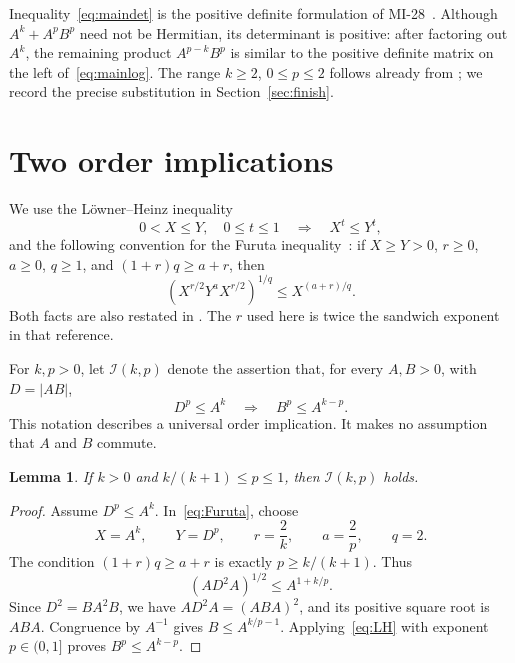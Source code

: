 \documentclass[11pt,a4paper]{article}
\newtheorem{lemma}[theorem]{Lemma}
\theoremstyle{remark}
\begin{document}
Inequality~\eqref{eq:maindet} is the positive definite formulation
of MI-28~\cite{MI28,GThesis}. Although \(A^k+A^pB^p\) need not be
Hermitian, its determinant is positive: after factoring out \(A^k\),
the remaining product \(A^{p-k}B^p\) is similar to the positive
definite matrix on the left of~\eqref{eq:mainlog}.
The range \(k\ge2\), \(0\le p\le2\) follows already from
\cite[Lemma~2.5]{GAMA20}; we record the precise substitution in
Section~\ref{sec:finish}.

\section{Two order implications}

We use the L\"owner--Heinz inequality
\begin{equation}\label{eq:LH}
 0<X\le Y,\quad 0\le t\le1
 \quad\Longrightarrow\quad X^t\le Y^t,
\end{equation}
and the following convention for the Furuta inequality~\cite{Furuta87}:
if \(X\ge Y>0\), \(r\ge0\), \(a\ge0\), \(q\ge1\), and
\((1+r)q\ge a+r\), then
\begin{equation}\label{eq:Furuta}
 (X^{r/2}Y^aX^{r/2})^{1/q}\le X^{(a+r)/q}.
\end{equation}
Both facts are also restated in
\cite[Propositions~1--2]{Tanahashi99}. The \(r\) used here is twice
the sandwich exponent in that reference.

For \(k,p>0\), let \(\mathcal I(k,p)\) denote the assertion that,
for every \(A,B>0\), with \(D=|AB|\),
\begin{equation}\label{eq:imp}
 D^p\le A^k\quad\Longrightarrow\quad B^p\le A^{k-p}.
\end{equation}
This notation describes a universal order implication.
It makes no assumption that \(A\) and \(B\) commute.

\begin{lemma}\label{lem:small}
If \(k>0\) and \(k/(k+1)\le p\le1\), then \(\mathcal I(k,p)\)
holds.
\end{lemma}

\begin{proof}
Assume \(D^p\le A^k\). In~\eqref{eq:Furuta}, choose
\[
 X=A^k,\qquad Y=D^p,\qquad r=\frac2k,\qquad
 a=\frac2p,\qquad q=2 .
\]
The condition \((1+r)q\ge a+r\) is exactly
\(p\ge k/(k+1)\). Thus
\[
 (AD^2A)^{1/2}\le A^{1+k/p}.
\]
Since \(D^2=BA^2B\), we have \(AD^2A=(ABA)^2\), and its positive
square root is \(ABA\). Congruence by \(A^{-1}\) gives
\(B\le A^{k/p-1}\). Applying~\eqref{eq:LH} with exponent
\(p\in(0,1]\) proves \(B^p\le A^{k-p}\).
\end{proof}
\end{document}
